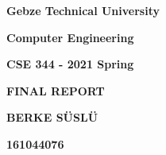 \documentclass[12pt]{article}
\begin{document}
\vspace{\baselineskip}

\vspace{\baselineskip}

\vspace{\baselineskip}

\vspace{\baselineskip}

\vspace{\baselineskip}

\vspace{\baselineskip}
\begin{Center}
{\fontsize{16pt}{19.2pt}\selectfont \textbf{Gebze Technical University}}
\end{Center}
\begin{Center}
{\fontsize{16pt}{19.2pt}\selectfont \textbf{Computer Engineering}}
\end{Center}

\vspace{\baselineskip}

\vspace{\baselineskip}

\vspace{\baselineskip}
\begin{Center}
{\fontsize{16pt}{19.2pt}\selectfont \textbf{CSE 344 - 2021 Spring}}
\end{Center}

\vspace{\baselineskip}

\vspace{\baselineskip}

\vspace{\baselineskip}
\begin{Center}
{\fontsize{16pt}{19.2pt}\selectfont \textbf{FINAL REPORT}}
\end{Center}

\vspace{\baselineskip}

\vspace{\baselineskip}

\vspace{\baselineskip}

\vspace{\baselineskip}

\vspace{\baselineskip}

\vspace{\baselineskip}

\vspace{\baselineskip}
\begin{Center}
{\fontsize{16pt}{19.2pt}\selectfont \textbf{BERKE SÜSLÜ}}
\end{Center}
\begin{Center}
{\fontsize{16pt}{19.2pt}\selectfont \textbf{161044076}}
\end{Center}
\end{document}
